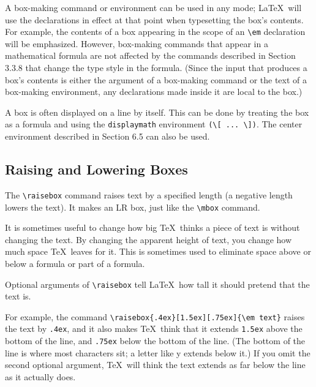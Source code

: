 \documentclass{article}
\begin{document}
A box-making command or environment can be used in any mode; \LaTeX\ will use the declarations in
effect at that point when typesetting the box's contents. For example, the contents of a box
appearing in the scope of an \verb:\em: declaration will be emphasized. However, box-making
commands that appear in a mathematical formula are not affected by the commands described in
Section 3.3.8 that change the type style in the formula. (Since the input
that produces a box's contents is either the argument of a box-making command or the text of a
box-making environment, any declarations made inside it are local to the box.)

A box is often displayed on a line by itself. This can be done by treating the box as a formula and
using the \texttt{displaymath} environment \verb:(\[ ... \]):. The center environment described in
Section 6.5 can also be used.

\subsection{Raising and Lowering Boxes}

The \verb:\raisebox: command raises text by a specified length (a negative length lowers the text).
It makes an LR box, just like the \verb:\mbox: command. 


It is sometimes useful to change how big \TeX\ thinks a piece of text is without changing the text.
By changing the apparent height of text, you change how much space \TeX\ leaves for it. This is
sometimes used to eliminate space above or below a formula or part of a formula.


Optional arguments of \verb:\raisebox: tell \LaTeX\ how tall it should pretend that the text is.

For example, the command \verb:\raisebox{.4ex}[1.5ex][.75ex]{\em text}: raises the text by 
\texttt{.4ex}, and it also makes \TeX\ think that it extends \texttt{1.5ex} above the bottom of the
line, and \texttt{.75ex} below the bottom of the line. (The bottom of the line is where most
characters sit; a letter like y extends below it.) If you omit the second optional argument, \TeX\
will think the text extends as far below the line as it actually does.
\end{document}
